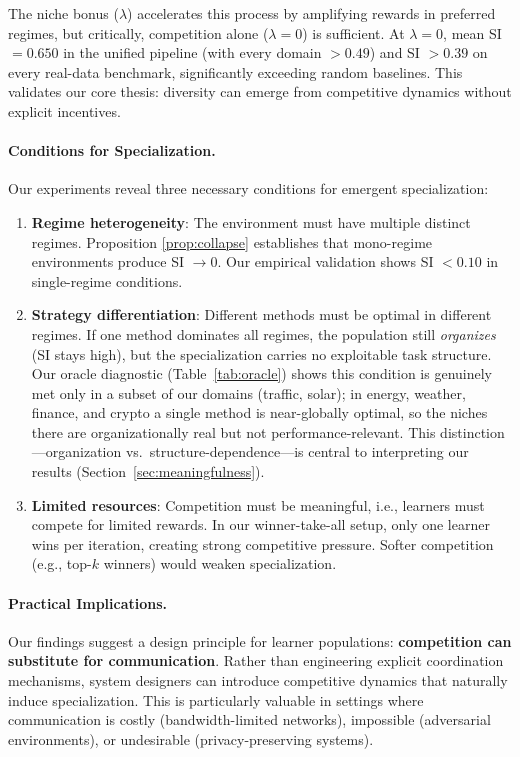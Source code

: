 \documentclass{article}
\begin{document}
The niche bonus ($\lambda$) accelerates this process by amplifying rewards in preferred regimes, but critically, competition alone ($\lambda = 0$) is sufficient. At $\lambda = 0$, mean SI $= 0.650$ in the unified pipeline (with every domain $> 0.49$) and SI $> 0.39$ on every real-data benchmark, significantly exceeding random baselines. This validates our core thesis: diversity can emerge from competitive dynamics without explicit incentives.

\paragraph{Conditions for Specialization.}
Our experiments reveal three necessary conditions for emergent specialization:

\begin{enumerate}
    \item \textbf{Regime heterogeneity}: The environment must have multiple distinct regimes. Proposition \ref{prop:collapse} establishes that mono-regime environments produce SI $\to 0$. Our empirical validation shows SI $< 0.10$ in single-regime conditions.

    \item \textbf{Strategy differentiation}: Different methods must be optimal in different regimes. If one method dominates all regimes, the population still \emph{organizes} (SI stays high), but the specialization carries no exploitable task structure. Our oracle diagnostic (Table~\ref{tab:oracle}) shows this condition is genuinely met only in a subset of our domains (traffic, solar); in energy, weather, finance, and crypto a single method is near-globally optimal, so the niches there are organizationally real but not performance-relevant. This distinction---organization vs.\ structure-dependence---is central to interpreting our results (Section~\ref{sec:meaningfulness}).

    \item \textbf{Limited resources}: Competition must be meaningful, i.e., learners must compete for limited rewards. In our winner-take-all setup, only one learner wins per iteration, creating strong competitive pressure. Softer competition (e.g., top-$k$ winners) would weaken specialization.
\end{enumerate}

\paragraph{Practical Implications.}
Our findings suggest a design principle for learner populations: \textbf{competition can substitute for communication}. Rather than engineering explicit coordination mechanisms, system designers can introduce competitive dynamics that naturally induce specialization. This is particularly valuable in settings where communication is costly (bandwidth-limited networks), impossible (adversarial environments), or undesirable (privacy-preserving systems).
\end{document}
